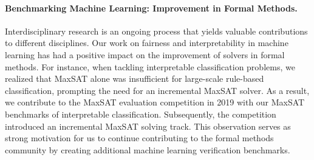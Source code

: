\paragraph{Benchmarking Machine Learning: Improvement in Formal Methods.} Interdisciplinary research is an ongoing process that yields valuable contributions to different disciplines. Our work on fairness and interpretability in machine learning has had a positive impact on the improvement of solvers in formal methods. For instance, when tackling interpretable classification problems, we realized that MaxSAT alone was insufficient for large-scale rule-based classification, prompting the need for an incremental MaxSAT solver. As a result, we contribute to the MaxSAT evaluation competition in 2019 with our MaxSAT benchmarks of interpretable classification. Subsequently, the competition introduced an incremental MaxSAT solving track. This observation serves as strong motivation for us to continue contributing to the formal methods community by creating additional machine learning verification benchmarks.




